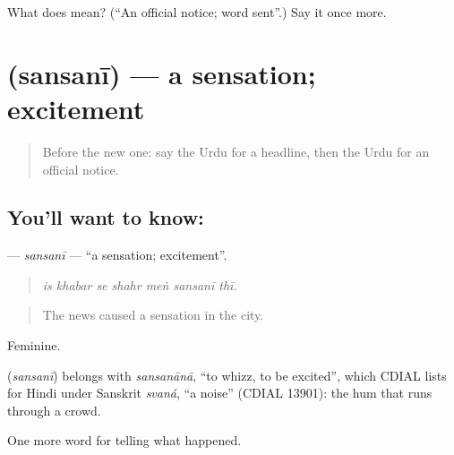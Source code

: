 \begin{tcolorbox}[breakable,colback=teal!4,colframe=teal!35!black,title={Before you move on}]
What does  mean? (\textquotedblleft{}An official notice; word sent\textquotedblright{}.) Say it once more.
\end{tcolorbox}
\section[\texorpdfstring{\ur{سنسنی} (sansanī)}{سنسنی (sansanī)}]{ (sansanī) — a sensation; excitement}

\label{lesson:UR-C300-sansani}



\begin{quote}
Before the new one: say the Urdu for a headline, then the Urdu for an official notice.
\end{quote}

\subsection*{You'll want to know: }
\textbf{} — \emph{sansanī} — \textquotedblleft{}a sensation; excitement\textquotedblright{}.

\begin{quote}
      
\end{quote}

\begin{quote}
\emph{is khabar se shahr meṅ sansanī thī.}
\end{quote}

\begin{quote}
The news caused a sensation in the city.
\end{quote}

Feminine.

\begin{cousinweb}
\textbf{} (\emph{sansanī}) belongs with \emph{sansanānā}, \textquotedblleft{}to whizz, to be excited\textquotedblright{}, which CDIAL lists for Hindi under Sanskrit \emph{svaná}, \textquotedblleft{}a noise\textquotedblright{} (CDIAL 13901): the hum that runs through a crowd.
\end{cousinweb}

\begin{grammarlens}[title={What you've built}]
One more word for telling what happened.
\end{grammarlens}


